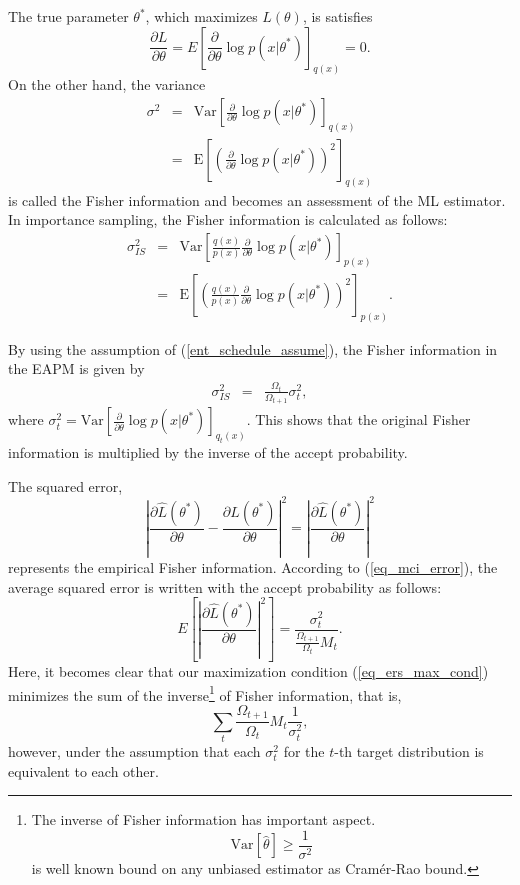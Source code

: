 The true parameter $\theta^*$, which maximizes $L(\theta)$, is satisfies
\begin{equation}
 \frac{\partial L}{\partial \theta}=E
\left[\frac{\partial}{\partial \theta}
  \log p(x|\theta^*)\right]_{q(x)}
=0.
\end{equation}
On the other hand, the variance 
\begin{eqnarray}
\sigma^2 &=& \mathrm{Var}
\left[\frac{\partial}{\partial \theta}
  \log p(x|\theta^*)\right]_{q(x)}\\
&=&
\mathrm{E}
\left[
\left(
\frac{\partial}{\partial \theta}
  \log p(x|\theta^*)
\right)^2
\right]_{q(x)}
\end{eqnarray}
is called the Fisher information and
becomes an assessment of the ML estimator.
In importance sampling, the Fisher information is calculated as follows:
\begin{eqnarray}
\sigma^2_{IS} &=& \mathrm{Var}
\left[\frac{q(x)}{p(x)}\frac{\partial}{\partial \theta}
  \log p(x|\theta^*)\right]_{p(x)}\\
&=&
\mathrm{E}
\left[
\left(
\frac{q(x)}{p(x)}
\frac{\partial}{\partial \theta}
  \log p(x|\theta^*)
\right)^2
\right]_{p(x)}.
\end{eqnarray}

By using the assumption of (\ref{ent_schedule_assume}),
the Fisher information in the EAPM is given by
\begin{eqnarray}
 \sigma^2_{IS}&=&\frac{\Omega_t}{\Omega_{t+1}}\sigma^2_t,
\end{eqnarray}
where $\sigma^2_t = \mathrm{Var}
\left[\frac{\partial}{\partial \theta}
  \log p(x|\theta^*)\right]_{q_t(x)}$.
This shows that the original Fisher information is multiplied by 
the inverse of the accept probability. 

The squared error,
\begin{equation}
\left|\frac{\partial \hat L(\theta^*)}{\partial \theta}
-\frac{\partial L(\theta^*)}{\partial \theta}\right|^2
=
\left|
\frac{\partial \hat L(\theta^*)}{\partial \theta}
\right|^2
\end{equation}
represents the empirical Fisher information.
According to (\ref{eq_mci_error}),
the average squared error is written with the accept probability as follows:
\begin{equation}
E\left[
\left|
\frac{\partial \hat L(\theta^*)}{\partial \theta}
\right|^2
\right]
=
\frac{\sigma_t^2}
{
\frac{\Omega_{t+1}}{\Omega_{t}}M_t
}.
\end{equation}
Here, it becomes clear that our maximization condition  
(\ref{eq_ers_max_cond}) minimizes the sum of the inverse\footnote{
The inverse of Fisher information has important aspect.
\begin{equation}
 \mathrm{Var}[\hat \theta] \geq \frac{1}{\sigma^2}
\end{equation}
is well known bound on any unbiased estimator
as Cram\'{e}r-Rao bound. 
}
 of Fisher
information, that is, 
\begin{equation}
\sum_t
{
\frac{\Omega_{t+1}}{\Omega_{t}}M_t
}
\frac{1}{\sigma_t^2},
\end{equation}
 however, 
under the assumption that each $\sigma^2_t$ for the $t$-th 
target distribution is equivalent to each other.  


